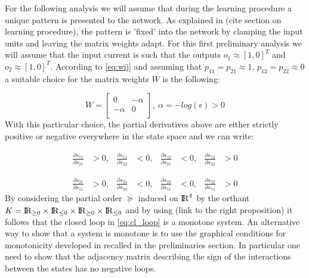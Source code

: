 For the following analysis we will assume that during the learning procedure a unique pattern is presented to the network. As explained in (cite section on learning procedure), the pattern is 'fixed' into the network by clamping the input units and leaving the matrix weights adapt. For this first preliminary analysis we will assume that the input current is such that the outputs $o_1 \approx [1 , 0]^T$ and $o_2 \approx [1, 0]^T$. According to \eqref{eq:wij} and assuming that $p_{11} = p_{21} \approx 1$, $p_{12} = p_{22} \approx 0$ a suitable choice for the matrix weights $W$ is the following:  

\begin{equation}
W = \begin{bmatrix}
 0 & -\alpha \\
 -\alpha & 0 \\
\end{bmatrix},\  \alpha = - log(\epsilon) >0
\label{eq:coup_eps_matrix}
\end{equation}
With this particular choice, the partial derivatives above are either strictly positive or negative everywhere in the state space and we can write:

\begin{equation}
\begin{aligned}
\frac{\partial s_{11}}{\partial s_{21}} & > 0, & 
\frac{\partial s_{11}}{\partial s_{22}} & < 0, & \frac{\partial s_{12}}{\partial s_{21}} &< 0, & \frac{\partial s_{12}}{\partial s_{22}}  &> 0
\end{aligned}
\end{equation}

\begin{equation}
\begin{aligned}
\frac{\partial s_{21}}{\partial s_{11}} & > 0, & 
\frac{\partial s_{21}}{\partial s_{22}} & < 0, & \frac{\partial s_{22}}{\partial s_{11}} &< 0, & \frac{\partial s_{22}}{\partial s_{12}}  &> 0
\end{aligned}
\end{equation}
By considering the partial order $\succeq$ induced on ${\rm I\!R}^4$ by the orthant $K = {\rm I\!R}_{\geq 0} \times {\rm I\!R}_{\leq 0} \times {\rm I\!R}_{\geq 0} \times {\rm I\!R}_{\leq 0}$ and by using (link to the right proposition) it follows that the closed loop in \eqref{eq:cl_loop} is a monotone system. An alternative way to show that a system is monotone is to use the graphical conditions for monotonicity developed in \cite{angeli2004multigraph} recalled in the preliminaries section. In particular one need to show that the adjacency matrix describing the sign of the interactions between the states has no negative loops.

